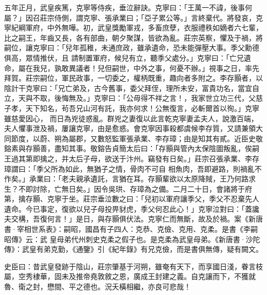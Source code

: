 \begin{pinyinscope}
 五年正月，武皇疾篤，克寧等侍疾，垂泣辭訣。克寧曰：「王萬一不諱，後事何屬？」因召莊宗侍側，謂克寧、張承業曰；「亞子累公等。」言終棄代。將發哀，克寧紀綱軍府，中外無嘩。初，武皇獎勵軍戎，多畜庶孽，衣服禮秩如嫡者六七輩，比之嗣王，年齒又長，各有部曲，朝夕聚謀，皆欲為亂。莊宗英察，懼及于禍，將嗣位，讓克寧曰：「兒年孤稚，未通庶政，雖承遺命，恐未能彈壓大事。季父勳德俱高，眾情推伏，且
 請制置軍府，候兒有立，聽季父處分。」克寧曰：「亡兄遺命，屬在我兒，孰敢異議者！兒但嗣世，中外之事，何憂不辦。」視事之日，率先拜賀。莊宗嗣位，軍民政事，一切委之，權柄既重，趣向者多附之。李存顥者，以陰計干克寧曰：「兄亡弟及，古今舊事，委父拜侄，理所未安，富貴功名，當宜自立，天與不取，後悔無及。」克寧曰：「公毋得不祥之言！，我家世立功三代，父慈子孝，天下知名，茍吾兄山河有託，我亦何求！公無復言，必斬爾首以徇。」克寧雖慈愛因心，
 而日為兇徒惑亂。群兇之妻復以此言乾克寧妻孟夫人，說激百端，夫人懼事泄及禍，屢讓克寧，由是愈惑。會克寧因事殺都虞候李存質，又請兼領大同節度，以蔚、朔為屬郡，又數怒監軍張承業、李存璋；由是知其有貳。近臣史敬鎔素與存顥善，盡知其事。敬鎔告貞簡太后曰：「存顥與管內太保陰圖叛亂，俟嗣王過其第即擒之，并太后子母，欲送于汴州。竊發有日矣。」莊宗召張承業、李存璋謂曰：「季父所為如此，無猶子之情，骨肉不可自
 相魚肉，吾即避路，則禍亂不作矣。」承業曰：「老夫親承遺託，言猶在耳。存顥輩欲以太原降賊，王乃何路求生？不即討除，亡無日矣。」因令吳珙、存璋為之備。二月二十日，會諸將于府第，擒存顥、克寧于坐。莊宗垂泣數之曰：「兒初以軍府讓季父，季父不忍棄先人遺命。今已事定，復欲以兒子母投畀豺虎，季父何忍此心！」克寧泣對曰：「蓋讒夫交構，吾復何言！」是日，與存顥俱伏法。克寧仁而無斷，故及於禍。案《新唐書·宰相世系表》：嗣昭，國昌有子四人：克恭、克儉、克用、克柔。是書《李嗣昭傳》云：武
 皇母弟代州刺史克柔之假子也。是克柔為武皇母弟。《新唐書·沙陀傳》：武皇有弟克勤，《通鑒》引《紀年錄》有兄克儉，而是書俱無傳，疑有闕文。



 史臣曰：昔武皇發跡于陰山，莊宗肇基于河朔，雖奄有天下，而享國日淺，眷言枝屬，空秀棣華，固未及推帝堯敦敘之恩，廣成王封建之義。自克讓而下，不獲就魯、衛之封，懋間、平之德也。況夭橫相繼，亦良可悲哉！



\end{pinyinscope}